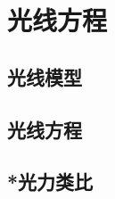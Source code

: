 

\section{光线方程}\label{22-3}

\subsection{光线模型}\label{22-3-1}

\subsection{光线方程}\label{22-3-2}

\subsection{*光力类比}\label{22-3-3}